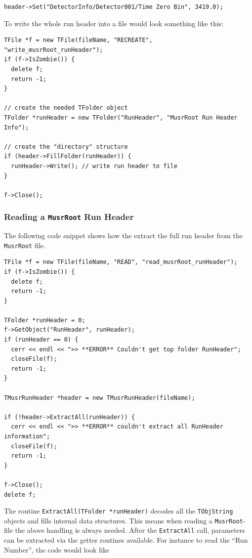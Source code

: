 \documentclass[twoside]{article}
\newcommand{\musrroot}{\texttt{MusrRoot}\xspace}
\newcommand{\tobjstring}{\texttt{TObjString}\xspace}
\begin{document}
\begin{shaded}
\begin{verbatim}  
header->Set("DetectorInfo/Detector001/Time Zero Bin", 3419.0);
\end{verbatim}
\end{shaded}

\noindent To write the whole run header into a file would look something like this:

\begin{shaded}
\begin{verbatim}  
TFile *f = new TFile(fileName, "RECREATE", "write_musrRoot_runHeader");
if (f->IsZombie()) {
  delete f;
  return -1;
}

// create the needed TFolder object
TFolder *runHeader = new TFolder("RunHeader", "MusrRoot Run Header Info");

// create the "directory" structure
if (header->FillFolder(runHeader)) {
  runHeader->Write(); // write run header to file
}

f->Close();
\end{verbatim}
\end{shaded}


\subsubsection{Reading a \musrroot Run Header}\label{sec:UserInterfaceReading}

The following code snippet shows how the extract the full run header from the \musrroot file.

\begin{shaded}
\begin{verbatim}  
TFile *f = new TFile(fileName, "READ", "read_musrRoot_runHeader");
if (f->IsZombie()) {
  delete f;
  return -1;
}

TFolder *runHeader = 0;
f->GetObject("RunHeader", runHeader);
if (runHeader == 0) {
  cerr << endl << ">> **ERROR** Couldn't get top folder RunHeader";
  closeFile(f);
  return -1;
}

TMusrRunHeader *header = new TMusrRunHeader(fileName);

if (!header->ExtractAll(runHeader)) {
  cerr << endl << ">> **ERROR** couldn't extract all RunHeader information";
  closeFile(f);
  return -1;
}

f->Close();
delete f;
\end{verbatim}
\end{shaded}

\noindent The routine \texttt{ExtractAll(TFolder *runHeader)} decodes all the \tobjstring objects and fills internal data structures. This means when reading a \musrroot-file the above handling is always needed. After the \texttt{ExtractAll} call, parameters can be extracted via the getter routines available. For instance to read the ``Run Number'', the code would look like 
\end{document}
